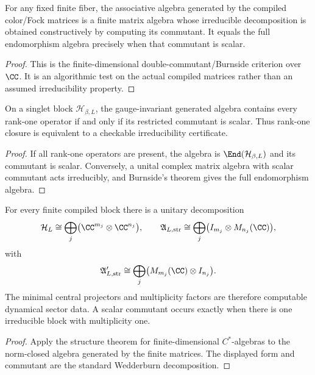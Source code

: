 \documentclass[12pt,a4paper]{article}
\begin{document}
\begin{lemma}
\label{p10:lem:local-color-fock-matrix-units}
For any fixed finite fiber, the associative algebra generated by the compiled color/Fock matrices is a finite matrix algebra whose irreducible decomposition is obtained constructively by computing its commutant.  It equals the full endomorphism algebra precisely when that commutant is scalar.
\end{lemma}
\begin{proof}
This is the finite-dimensional double-commutant/Burnside criterion over \(\CC\).  It is an algorithmic test on the actual compiled matrices rather than an assumed irreducibility property.
\end{proof}

\begin{lemma}
\label{p10:lem:gauge-singlet-rank-one-closure}
On a singlet block \(\mathcal H_{\beta,L}\), the gauge-invariant generated algebra contains every rank-one operator if and only if its restricted commutant is scalar.  Thus rank-one closure is equivalent to a checkable irreducibility certificate.
\end{lemma}
\begin{proof}
If all rank-one operators are present, the algebra is \(\End(\mathcal H_{\beta,L})\) and its commutant is scalar.  Conversely, a unital complex matrix algebra with scalar commutant acts irreducibly, and Burnside's theorem gives the full endomorphism algebra.
\end{proof}

\begin{theorem}
\label{p10:thm:finite-strong-algebra-centralizer}
For every finite compiled block there is a unitary decomposition
\begin{equation}
\label{p10:eq:finite-strong-algebra-centralizer}
\mathcal H_L\cong\bigoplus_j\bigl(\CC^{m_j}\otimes\CC^{n_j}\bigr),\qquad
\mathfrak A_{L,{\rm str}}\cong\bigoplus_j\bigl(I_{m_j}\otimes M_{n_j}(\CC)\bigr),
\end{equation}
with
\begin{equation}
\mathfrak A'_{L,{\rm str}}\cong\bigoplus_j\bigl(M_{m_j}(\CC)\otimes I_{n_j}\bigr).
\end{equation}
The minimal central projectors and multiplicity factors are therefore computable dynamical sector data.  A scalar commutant occurs exactly when there is one irreducible block with multiplicity one.
\end{theorem}
\begin{proof}
Apply the structure theorem for finite-dimensional \(C^*\)-algebras to the norm-closed algebra generated by the finite matrices.  The displayed form and commutant are the standard Wedderburn decomposition.
\end{proof}
\end{document}
